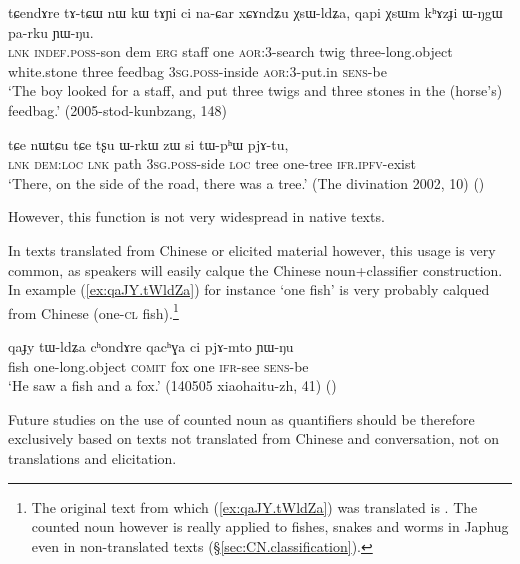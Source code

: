 \begin{exe}
	\ex \label{ex:xCAndZu.XsWldZa}
	\gll tɕendɤre tɤ-tɕɯ nɯ kɯ tɤɲi ci na-ɕar xɕɤndʑu χsɯ-ldʑa, qapi χsɯm kʰɤzɟi ɯ-ŋgɯ pa-rku ɲɯ-ŋu. \\
	\textsc{lnk} \textsc{indef}.\textsc{poss}-son dem \textsc{erg} staff one \textsc{aor}:3\flobv{}-search twig three-long.object white.stone three feedbag \textsc{3sg}.\textsc{poss}-inside \textsc{aor}:3\flobv{}-put.in \textsc{sens}-be \\
	\glt `The boy looked for a staff, and put three twigs and three stones in the (horse's) feedbag.' (2005-stod-kunbzang, 148)
\end{exe} 

\begin{exe}
	\ex \label{ex:si.tWphW.pjAtu}
	\gll tɕe nɯtɕu tɕe tʂu ɯ-rkɯ zɯ si tɯ-pʰɯ pjɤ-tu,  \\
	\textsc{lnk} \textsc{dem}:\textsc{loc} \textsc{lnk} path \textsc{3sg}.\textsc{poss}-side \textsc{loc} tree one-tree \textsc{ifr}.\textsc{ipfv}-exist \\
	\glt `There, on the side of the road, there was a tree.' (The divination 2002, 10)
()
\end{exe} 

However, this function is not very widespread in native texts.

In texts translated from Chinese or elicited material however, this usage is very common, as speakers will easily calque the Chinese noun+classifier construction. In example (\ref{ex:qaJY.tWldZa}) for instance  `one fish' is very probably calqued from Chinese   (one-\textsc{cl} fish).\footnote{The original text from which (\ref{ex:qaJY.tWldZa}) was translated is . The counted noun  however is really applied to fishes, snakes and worms in Japhug even in non-translated texts (§\ref{sec:CN.classification}).  } 

\begin{exe}
	\ex \label{ex:qaJY.tWldZa}
	\gll qaɟy tɯ-ldʑa cʰondɤre qacʰɣa ci pjɤ-mto ɲɯ-ŋu \\
	fish one-long.object \textsc{comit} fox one \textsc{ifr}-see \textsc{sens}-be \\
	\glt `He saw a fish and a fox.' (140505 xiaohaitu-zh, 41)
()
\end{exe} 

Future studies on the use of counted noun as quantifiers should be therefore exclusively based on texts not translated from Chinese and conversation, not on translations and elicitation.


